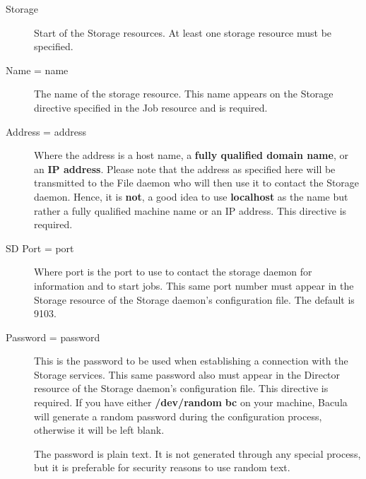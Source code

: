 \begin{description}

\item [Storage]
   Start of the Storage resources. At least one  storage resource must be
   specified. 

\item [Name = \lt{}name\gt{}]
   The name of the storage resource. This  name appears on the Storage directive
   specified in the Job resource and is required. 

\item [Address = \lt{}address\gt{}]
   Where the address is a host name,  a {\bf fully qualified domain name}, or an
   {\bf IP address}. Please note  that the \lt{}address\gt{} as specified here
   will be transmitted to  the File daemon who will then use it to contact the
   Storage daemon. Hence,  it is {\bf not}, a good idea to use {\bf localhost} as
   the  name but rather a fully qualified machine name or an IP address.  This
   directive is required. 

\item [SD Port = \lt{}port\gt{}]
   Where port is the port to use to  contact the storage daemon for information
   and to start jobs.  This same port number must appear in the Storage resource
   of the  Storage daemon's configuration file. The default is 9103. 

\item [Password = \lt{}password\gt{}]
   This is the password to be used  when establishing a connection with the
   Storage services. This  same password also must appear in the Director
   resource of the Storage  daemon's configuration file. This directive is
   required.  If you have either {\bf /dev/random}  {\bf bc} on your machine,
   Bacula will generate a random  password during the configuration process,
   otherwise it will  be left blank. 

   The password is plain text.  It is not generated through any special
   process, but it is preferable for security reasons to use random text.


\end{description}
